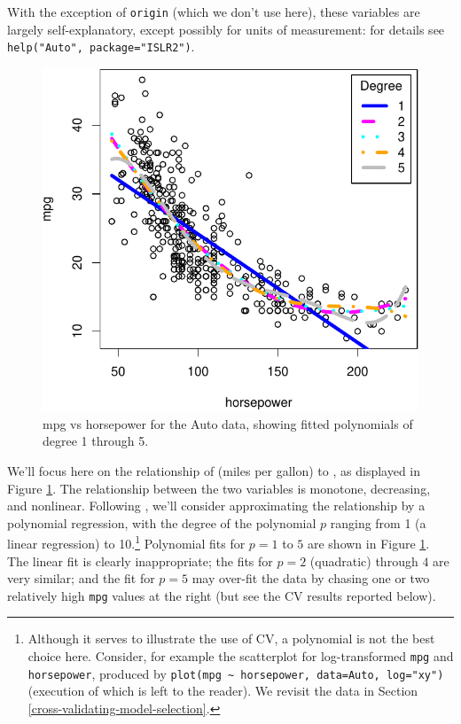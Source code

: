 \documentclass[
]{jss}
\begin{document}
With the exception of \texttt{origin} (which we don't use here), these
variables are largely self-explanatory, except possibly for units of
measurement: for details see \texttt{help("Auto",\ package="ISLR2")}.

\begin{CodeChunk}
\begin{figure}

{\centering \includegraphics[width=0.5\linewidth]{JSS-article-reduced_files/figure-latex/mpg-horsepower-scatterplot-polynomials-1} 

}

\caption[mpg vs horsepower for the Auto data, showing fitted polynomials of degree 1 through 5]{mpg vs horsepower for the Auto data, showing fitted polynomials of degree 1 through 5.}\label{fig:mpg-horsepower-scatterplot-polynomials}
\end{figure}
\end{CodeChunk}

We'll focus here on the relationship of  (miles per gallon) to
, as displayed in Figure
\ref{fig:mpg-horsepower-scatterplot-polynomials}. The relationship
between the two variables is monotone, decreasing, and nonlinear.
Following \citet{JamesEtAl:2021}, we'll consider approximating the
relationship by a polynomial regression, with the degree of the
polynomial \(p\) ranging from 1 (a linear regression) to 10.\footnote{Although
  it serves to illustrate the use of CV, a polynomial is not the best
  choice here. Consider, for example the scatterplot for log-transformed
  \texttt{mpg} and \texttt{horsepower}, produced by
  \texttt{plot(mpg\ \textasciitilde{}\ horsepower,\ data=Auto,\ log="xy")}
  (execution of which is left to the reader). We revisit the 
  data in Section \ref{cross-validating-model-selection}.} Polynomial
fits for \(p = 1\) to \(5\) are shown in Figure
\ref{fig:mpg-horsepower-scatterplot-polynomials}. The linear fit is
clearly inappropriate; the fits for \(p = 2\) (quadratic) through \(4\)
are very similar; and the fit for \(p = 5\) may over-fit the data by
chasing one or two relatively high \texttt{mpg} values at the right (but
see the CV results reported below).
\end{document}
